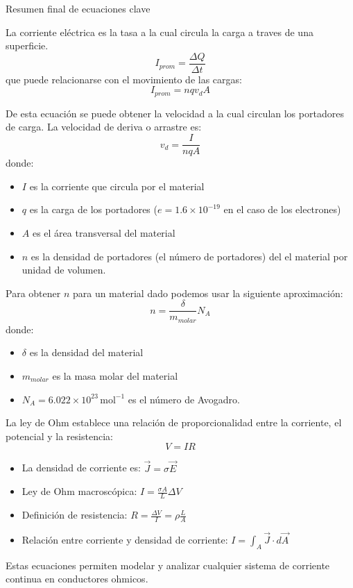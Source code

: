 Resumen final de ecuaciones clave

\begin{tcolorbox}[title=Corriente Eléctrica]
  La corriente eléctrica es la tasa a la cual circula la carga a traves de una superficie.
  \[
    I_{prom} = \frac{\Delta Q}{\Delta t}
  \]
  que puede relacionarse con el movimiento de las cargas:
  \[
    I_{prom} = n q v_d A
  \]

  De esta ecuación se puede obtener la velocidad a la cual circulan los portadores de carga. La velocidad de deriva o arrastre es:
  \[
    v_d = \frac{I}{nqA}
  \]
  donde:
  \begin{itemize}
    \item \(I\) es la corriente que circula por el material
    \item \(q\) es la carga de los portadores (\(e=1.6\times10^{-19}\) en el caso de los electrones)
    \item \(A\) es el área transversal del material
    \item \(n\) es la densidad de portadores (el número de portadores) del el material por unidad de volumen.
  \end{itemize}

  Para obtener \(n\) para un material dado podemos usar la siguiente aproximación:
  \[
    n=\frac{\delta}{m_{molar}} N_A
  \]
  donde:
  \begin{itemize}
    \item \(\delta\) es la densidad del material
    \item \(m_{molar}\) es la masa molar del material
    \item \(N_A = 6.022 \times 10^{23} \, \mathrm{mol}^{-1}\) es el número de Avogadro.
  \end{itemize}
\end{tcolorbox}

\begin{tcolorbox}[title=Ley de Ohm]
  La ley de Ohm establece una relación de proporcionalidad entre la corriente, el potencial y la resistencia:
  \[
    V = IR
  \]
  \begin{itemize}
    \item La densidad de corriente es: \(\vec{J} = \sigma \vec{E}\)
    \item Ley de Ohm macroscópica: \(I = \frac{\sigma A}{L} \Delta V\)
    \item Definición de resistencia: \(R = \frac{\Delta V}{I} = \rho \frac{L}{A}\)
    \item Relación entre corriente y densidad de corriente: \(I = \int_A \vec{J} \cdot d\vec{A}\)
  \end{itemize}
  Estas ecuaciones permiten modelar y analizar cualquier sistema de corriente continua en conductores ohmicos.
\end{tcolorbox}


